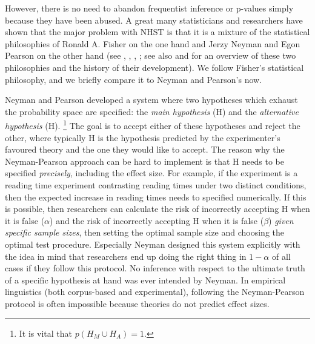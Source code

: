 However, there is no need to abandon frequentist inference or p-values simply because they have been abused.
A great many statisticians and researchers have shown that the major problem with NHST is that it is a mixture of the statistical philosophies of Ronald A. Fisher on the one hand and Jerzy Neyman and Egon Pearson on the other hand (see \citealt{Goodman2008}, \citealt{Perezgonzalez2014}, \citealt{Perezgonzalez2015}, \citealt{GreenlandEa2016}; see also \citealt{Lehmann1993} and \citealt{Lehmann2011} for an overview of these two philosophies and the history of their development).
We follow Fisher's statistical philosophy, and we briefly compare it to Neyman and Pearson's now.

Neyman and Pearson developed a system where two hypotheses which exhaust the probability space are specified:
the \textit{main hypothesis} (H) and the \textit{alternative hypothesis} (H).%
\footnote{It is vital that $p(H_M\cup H_A)=1$.}
The goal is to accept either of these hypotheses and reject the other, where typically H is the hypothesis predicted by the experimenter's favoured theory and the one they would like to accept.
The reason why the Neyman-Pearson approach can be hard to implement is that H needs to be specified \textit{precisely}, \ie including the effect size.
For example, if the experiment is a reading time experiment contrasting reading times under two distinct conditions, then the expected increase in reading times needs to specified numerically.
If this is possible, then researchers can calculate the risk of incorrectly accepting H when it is false ($\alpha$) and the risk of incorrectly accepting H when it is false ($\beta$) \textit{given specific sample sizes}, then setting the optimal sample size and choosing the optimal test procedure.
Especially Neyman designed this system explicitly with the idea in mind that researchers end up doing the right thing in $1-\alpha$ of all cases if they follow this protocol.
No inference with respect to the ultimate truth of a specific hypothesis at hand was ever intended by Neyman.
In empirical linguistics (both corpus-based and experimental), following the Neyman-Pearson protocol is often impossible because theories do not predict effect sizes.

